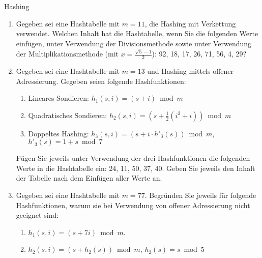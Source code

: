 \documentclass[11pt,a4paper]{article}
\begin{document}
\thispagestyle{empty}




\begin{aufgabe}{1}{Hashing}
    \begin{enumerate}
        \item Gegeben sei eine Hashtabelle mit $m = 11$, die Hashing mit Verkettung verwendet.
        Welchen Inhalt hat die Hashtabelle, wenn Sie die folgenden Werte einfügen, unter Verwendung der Divisionsmethode sowie unter Verwendung der Multiplikationsmethode (mit $x = \frac{\sqrt{5} - 1}{2}$):
        92, 18, 17, 26, 71, 56, 4, 29?
        \item Gegeben sei eine Hashtabelle mit $m = 13$ und Hashing mittels offener Adressierung.
        Gegeben seien folgende Hashfunktionen:
        \begin{enumerate}[label=\roman*)]
            \item Lineares Sondieren: $h_1(s, i) = (s + i) \bmod m$
            \item Quadratisches Sondieren: $h_2(s, i) = (s + \frac{1}{2} (i^2 + i)) \bmod m$
            \item Doppeltes Hashing: $h_3(s, i) = (s + i \cdot h'_3(s)) \bmod m$, $h'_3(s) = 1 + s \bmod 7$
        \end{enumerate}
        Fügen Sie jeweils unter Verwendung der drei Hashfunktionen die folgenden Werte in die Hashtabelle ein:
        24, 11, 50, 37, 40.
        Geben Sie jeweils den Inhalt der Tabelle nach dem Einfügen aller Werte an.
        \item
        Gegeben sei eine Hashtabelle mit $m = 77$.
        Begründen Sie jeweils für folgende Hashfunktionen, warum sie bei Verwendung von offener Adressierung nicht geeignet sind:
        \begin{enumerate}[label=\roman*)]
            \item $h_1(s, i) = (s + 7i) \bmod{m}$.
            \item $h_2(s, i) = (s + h_2(s)) \bmod{m}$, $h_2(s) = s \bmod 5$

\end{enumerate}
\end{enumerate}
\end{aufgabe}
\end{document}
